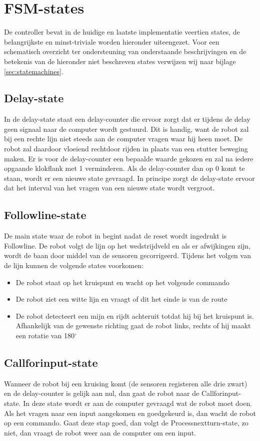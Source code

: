 \documentclass{report}
\begin{document}
\section{FSM-states}

De controller bevat in de huidige en laatste implementatie veertien states, de belangrijkste en minst-triviale worden hieronder uiteengezet. Voor een schematisch overzicht ter ondersteuning van onderstaande beschrijvingen en de betekenis van de hieronder niet beschreven states verwijzen wij naar bijlage \ref{sec:statemachines}.

\subsection{Delay-state}
In de delay-state staat een delay-counter die ervoor zorgt dat er tijdens de delay geen signaal naar de computer wordt gestuurd.
Dit is handig, want de robot zal bij een rechte lijn niet steeds aan de computer vragen waar hij heen moet.
De robot zal daardoor vloeiend rechtdoor rijden in plaats van een stutter beweging maken.
Er is voor de delay-counter een bepaalde waarde gekozen en zal na iedere opgaande klokflank met 1 verminderen.
Als de delay-counter dan op 0 komt te staan, wordt er een nieuwe state gevraagd.
In principe zorgt de delay-state ervoor dat het interval van het vragen van een nieuwe state wordt vergroot.

\subsection{Followline-state}
De main state waar de robot in begint nadat de reset wordt ingedrukt is Followline.
De robot volgt de lijn op het wedstrijdveld en als er afwijkingen zijn, wordt de baan door middel van de sensoren gecorrigeerd.
Tijdens het volgen van de lijn kunnen de volgende states voorkomen: 
\begin{itemize}
\item De robot staat op het kruispunt en wacht op het volgende commando
\item De robot ziet een witte lijn en vraagt of dit het einde is van de route
\item De robot detecteert een mijn en rijdt achteruit totdat hij bij het kruispunt is. Afhankelijk van de gewenste richting gaat de robot links, rechts of hij maakt een rotatie van 180$^\circ$
\end{itemize}

\subsection{Callforinput-state}
Wanneer de robot bij een kruising komt (de sensoren registeren alle drie zwart) en de delay-counter is gelijk aan nul, dan gaat de robot naar de Callforinput-state.
In deze state wordt er aan de computer gevraagd wat de robot moet doen.
Als het vragen naar een input aangekomen en goedgekeurd is, dan wacht de robot op een commando.
Gaat deze stap goed, dan volgt de Processnextturn-state, zo niet, dan vraagt de robot weer aan de computer om een input.
\end{document}
